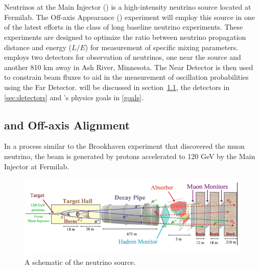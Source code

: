 \chapter{\nova}
\label{nova_chapter}
Neutrinos at the Main Injector (\numi) is a high-intensity neutrino source located at Fermilab.  The \numi Off-axis \nue Appearance (\nova) experiment will employ this source in one of the latest efforts in the class of long baseline neutrino experiments.  These experiments are designed to optimize the ratio between neutrino propagation distance and energy ($L/E$) for measurement of specific mixing parameters.  \nova employs two detectors for observation of neutrinos, one near the source and another 810 km away in Ash River, Minnesota.  The Near Detector is then used to constrain beam fluxes to aid in the measurement of oscillation probabilities using the Far Detector.  \numi will be discussed in section~\ref{sec:numi}, the detectors in \ref{sec:detectors} and \nova's physics goals in \ref{goals}. 

\section{\numi and  Off-axis Alignment }\label{sec:numi}

In a process similar to the Brookhaven experiment that discovered the muon neutrino, the \numi beam is generated by protons accelerated to 120 GeV by the Main Injector at Fermilab.  
\begin{figure}[t]
  \begin{center}
    \includegraphics[width=\textwidth]{figures/numi.png}
  \end{center}
  \caption{A schematic of the \numi neutrino source.}
  \label{numi}
\end{figure}


